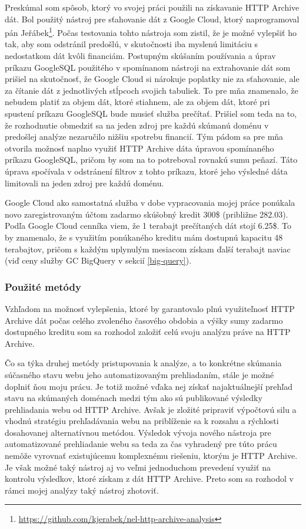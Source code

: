 Preskúmal som spôsob, ktorý vo svojej práci použili na získavanie HTTP Archive dát.
Bol použitý nástroj pre sťahovanie dát z Google Cloud, ktorý naprogramoval pán 
Jeřábek\footnote{\href{https://github.com/kjerabek/nel-http-archive-analysis}{https://github.com/kjerabek/nel-http-archive-analysis}}.
Počas testovania tohto nástroja som zistil, že je možné vylepšiť ho tak, aby som odstránil predošlú, v skutočnosti iba myslenú limitáciu s nedostatkom dát kvôli financiám.
Postupným skúšaním používania a úprav príkazu GoogleSQL použitého v spomínanom nástroji na extrahovanie dát som prišiel na skutočnosť, že Google Cloud
si nárokuje poplatky nie za sťahovanie, ale za čítanie dát z jednotlivých stĺpcoch svojich tabuliek.
To pre mňa znamenalo, že nebudem platiť za objem dát, ktoré stiahnem, ale za objem dát, ktoré pri spustení príkazu GoogleSQL bude musieť služba prečítať.
Prišiel som teda na to, že rozhodnutie obmedziť sa na jeden zdroj pre každú skúmanú doménu v predošlej analýze nezaručilo nižšiu spotrebu financií.
Tým pádom sa pre mňa otvorila možnosť naplno využiť HTTP Archive dáta úpravou spomínaného príkazu GoogleSQL, pričom by som na to potreboval rovnakú sumu peňazí.
Táto úprava spočívala v odstránení filtrov z tohto príkazu, ktoré jeho výsledné dáta limitovali na jeden zdroj pre každú doménu.

Google Cloud ako samostatná služba v dobe vypracovania mojej práce ponúkala novo zaregistrovaným účtom zadarmo skúšobný
kredit 300\$ (približne 282.03\texteuro). 
Podľa Google Cloud cenníka viem, že 1 terabajt prečítaných dát stojí 6.25\$.
To by znamenalo, že s využitím ponúkaného kreditu mám dostupnú kapacitu 48 terabajtov, 
pričom s každým uplynulým mesiacom získam ďalší terabajt naviac (viď ceny služby GC BigQuery v sekcií \ref{big-query}).

\subsubsection{Použité metódy}

Vzhľadom na možnosť vylepšenia, ktoré by garantovalo plnú využiteľnosť HTTP Archive dát počas celého zvoleného časového obdobia a výšky sumy zadarmo dostupného kreditu
som sa rozhodol založiť celú svoju analýzu práve na HTTP Archive.

Čo sa týka druhej metódy pristupovania k analýze, a to konkrétne skúmania súčasného stavu webu jeho automatizovaným prehliadaním,
stále je možné doplniť ňou moju prácu.
Je totiž možné vďaka nej získať najaktuálnejší prehľad stavu na skúmaných doménach medzi tým ako sú publikované výsledky prehliadania webu od HTTP Archive.
Avšak je zložité pripraviť výpočtovú silu a vhodnú stratégiu prehľadávania webu na priblíženie sa k rozsahu a rýchlosti dosahovanej alternatívnou metódou.
Výsledok vývoja nového nástroja pre automatizované prehliadanie webu sa teda za čas vyhradený pre túto prácu nemôže vyrovnať existujúcemu komplexnému riešeniu, ktorým je HTTP Archive.
Je však možné taký nástroj aj vo veľmi jednoduchom prevedení využiť na kontrolu výsledkov, ktoré získam z dát HTTP Archive.
Preto som sa rozhodol v rámci mojej analýzy taký nástroj zhotoviť.

